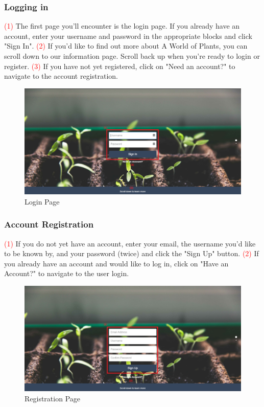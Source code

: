 \documentclass{article}
\begin{document}
	\subsubsection{Logging in}
		\textcolor{red}{(1)} The first page you'll encounter is the login page. If you already have an account, enter your username and password in the appropriate blocks and click "Sign In".
		\newline
		\textcolor{red}{(2)} If you'd like to find out more about A World of Plants, you can scroll down to our information page. Scroll back up when you're ready to login or register.
		\newline
		\textcolor{red}{(3)} If you have not yet registered, click on "Need an account?" to navigate to the account registration.
		\begin{figure}[H]
			\includegraphics[width=\textwidth]{../images/UserManual/login.PNG}
			\caption{Login Page}
		\end{figure}				
		
	\subsubsection{Account Registration}
		\textcolor{red}{(1)} If you do not yet have an account, enter your email, the username you'd like to be known by, and your password (twice) and click the "Sign Up" button.
		\newline
		\textcolor{red}{(2)} If you already have an account and would like to log in, click on "Have an Account?" to navigate to the user login.
		\newline
		\begin{figure}[H]
			\includegraphics[width=\textwidth]{../images/UserManual/registration.PNG}
			\caption{Registration Page}
		\end{figure}
		
\end{document}
